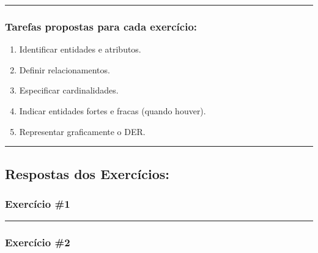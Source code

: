\documentclass[
]{book}
\makeatletter
\newcommand*\pandocbounded[1]{%
  \sbox\pandoc@box{#1}%
  \Gscale@div\@tempa{\textheight}{\dimexpr\ht\pandoc@box+\dp\pandoc@box\relax}%
  \Gscale@div\@tempb{\linewidth}{\wd\pandoc@box}%
  \ifdim\@tempb\p@<\@tempa\p@\let\@tempa\@tempb\fi%
  \ifdim\@tempa\p@<\p@\scalebox{\@tempa}{\usebox\pandoc@box}%
  \else\usebox{\pandoc@box}%
  \fi%
}
\providecommand{\tightlist}{%
  \setlength{\itemsep}{0pt}\setlength{\parskip}{0pt}}
\makeatother
\begin{document}
\pandocbounded{}

\begin{center}\rule{0.5\linewidth}{0.5pt}\end{center}

\subsubsection{Tarefas propostas para cada exercício:}\label{tarefas-propostas-para-cada-exercuxedcio}

\begin{enumerate}
\def\labelenumi{\arabic{enumi}.}
\tightlist
\item
  Identificar entidades e atributos.\\
\item
  Definir relacionamentos.\\
\item
  Especificar cardinalidades.\\
\item
  Indicar entidades fortes e fracas (quando houver).\\
\item
  Representar graficamente o DER.
\end{enumerate}

\begin{center}\rule{0.5\linewidth}{0.5pt}\end{center}

\subsection{Respostas dos Exercícios:}\label{respostas-dos-exercuxedcios}

\subsubsection{Exercício \#1}\label{exercuxedcio-1}

\pandocbounded{}

\begin{center}\rule{0.5\linewidth}{0.5pt}\end{center}

\subsubsection{Exercício \#2}\label{exercuxedcio-2}
\end{document}
